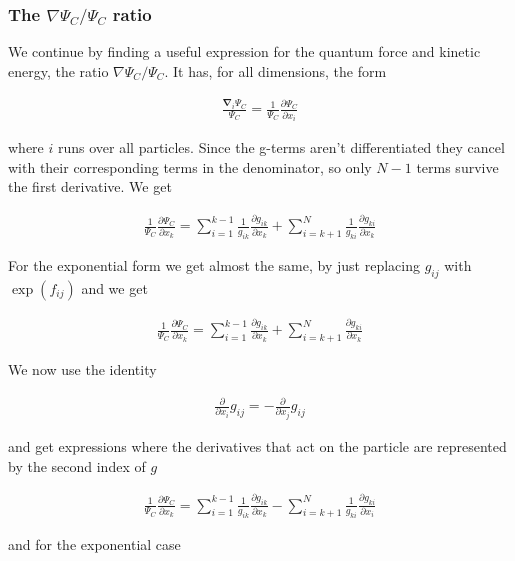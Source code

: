 \documentclass[11pt]{article}
\begin{document}
		\subsubsection{The $\nabla \Psi_{C}/\Psi_{C}$ ratio}
			We continue by finding a useful expression for the quantum force and kinetic energy, the ratio $\nabla\Psi_{C}/\Psi_{C}$. It has,
			for all dimensions, the form

			\begin{align}
				\frac{\mathbf{\nabla}_{i}\Psi_{C}}{\Psi_{C}}=\frac{1}{\Psi_{C}}\frac{\partial\Psi_{C}}{\partial x_{i}}
			\end{align}

			where $i$ runs over all particles. Since the g-terms aren't differentiated
			they cancel with their corresponding terms in the denominator, so
			only $N-1$ terms survive the first derivative. We get

			\begin{align}
				\frac{1}{\Psi_{C}}\frac{\partial\Psi_{C}}{\partial x_{k}}=\sum_{i=1}^{k-1}\frac{1}{g_{ik}}\frac{\partial g_{ik}}{\partial x_{k}}+\sum_{i=k+1}^{N}\frac{1}{g_{ki}}\frac{\partial g_{ki}}{\partial x_{k}}
			\end{align}

			For the exponential form we get almost the same, by just replacing
			$g_{ij}$ with $\exp\left(f_{ij}\right)$ and we get

			\begin{align}
				\frac{1}{\Psi_{C}}\frac{\partial\Psi_{C}}{\partial x_{k}}=\sum_{i=1}^{k-1}\frac{\partial g_{ik}}{\partial x_{k}}+\sum_{i=k+1}^{N}\frac{\partial g_{ki}}{\partial x_{k}}
			\end{align}

			We now use the identity

			\begin{align}
				\frac{\partial}{\partial x_{i}}g_{ij}=-\frac{\partial}{\partial x_{j}}g_{ij}
			\end{align}

			and get expressions where the derivatives that act on the particle
			are represented by the second index of $g$

			\begin{align}
				\frac{1}{\Psi_{C}}\frac{\partial\Psi_{C}}{\partial x_{k}}=\sum_{i=1}^{k-1}\frac{1}{g_{ik}}\frac{\partial g_{ik}}{\partial x_{k}}-\sum_{i=k+1}^{N}\frac{1}{g_{ki}}\frac{\partial g_{ki}}{\partial x_{i}}
			\end{align}

			and for the exponential case
\end{document}
